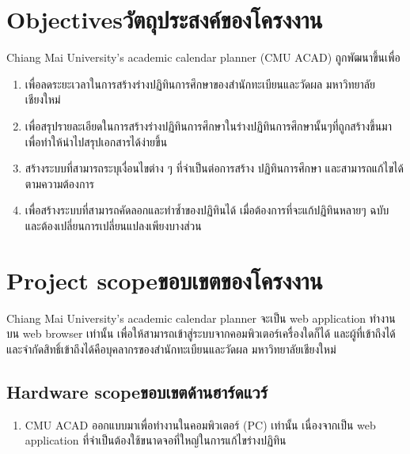 \newpage
\section{\ifenglish Objectives\else วัตถุประสงค์ของโครงงาน\fi}
Chiang Mai University's academic calendar planner (CMU ACAD)  ถูกพัฒนาขึ้นเพื่อ
\begin{enumerate}
    \item เพื่อลดระยะเวลาในการสร้างร่างปฏิทินการศึกษาของสำนักทะเบียนและวัดผล มหาวิทยาลัยเชียงใหม่
    \item เพื่อสรุปรายละเอียดในการสร้างร่างปฏิทินการศึกษาในร่างปฏิทินการศึกษานั้นๆที่ถูกสร้างขึ้นมาเพื่อทำให้นำไปสรุปเอกสารได้ง่ายขึ้น
    \item สร้างระบบที่สามารถระบุเงื่อนไขต่าง ๆ ที่จําเป็นต่อการสร้าง ปฏิทินการศึกษา และสามารถแก้ไขได้ตามความต้องการ
    \item เพื่อสร้างระบบที่สามารถคัดลอกและทำซ้ำของปฏิทินได้ เมื่อต้องการที่จะแก้ปฏิทินหลายๆ ฉบับ และต้องเปลี่ยนการเปลี่ยนแปลงเพียงบางส่วน
\end{enumerate}

\section{\ifenglish Project scope\else ขอบเขตของโครงงาน\fi}
Chiang Mai University's academic calendar planner จะเป็น web application ทำงานบน web browser เท่านั้น เพื่อให้สามารถเข้าสู่ระบบจากคอมพิวเตอร์เครื่องใดก็ได้ และผู้ที่เข้าถึงได้และจำกัดสิทธิ์เข้าถึงได้คือบุคลากรของสำนักทะเบียนและวัดผล มหาวิทยาลัยเชียงใหม่
\subsection{\ifenglish Hardware scope\else ขอบเขตด้านฮาร์ดแวร์\fi}
\begin{enumerate}
    \item CMU ACAD ออกแบบมาเพื่อทำงานในคอมพิวเตอร์ (PC) เท่านั้น เนื่องจากเป็น web application ที่จำเป็นต้องใช้ขนาดจอที่ใหญ่ในการแก้ไขร่างปฏิทิน
\end{enumerate}

